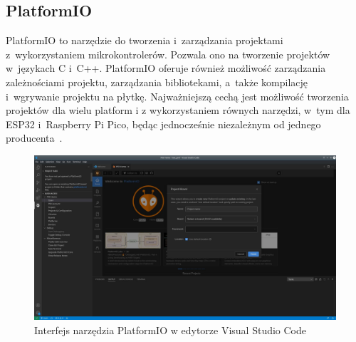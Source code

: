\subsection{PlatformIO}
PlatformIO to narzędzie do tworzenia i~zarządzania projektami z~wykorzystaniem mikrokontrolerów.
Pozwala ono na tworzenie projektów w~językach C i~C++.
PlatformIO oferuje również możliwość zarządzania zależnościami projektu, zarządzania bibliotekami, a~także kompilację i~wgrywanie projektu na płytkę.
Najważniejszą cechą jest możliwość tworzenia projektów dla wielu platform i z wykorzystaniem równych narzędzi, w~tym dla ESP32 i~Raspberry Pi Pico, będąc jednocześnie niezależnym od jednego producenta~\cite{tool:pio}.

\begin{figure}[b!]
    \begin{center}
        \includegraphics[width=15cm]{pic/pio.jpg}
    \end{center}
    \caption{Interfejs narzędzia PlatformIO w edytorze Visual Studio Code}\label{fig:pio}
\end{figure}
